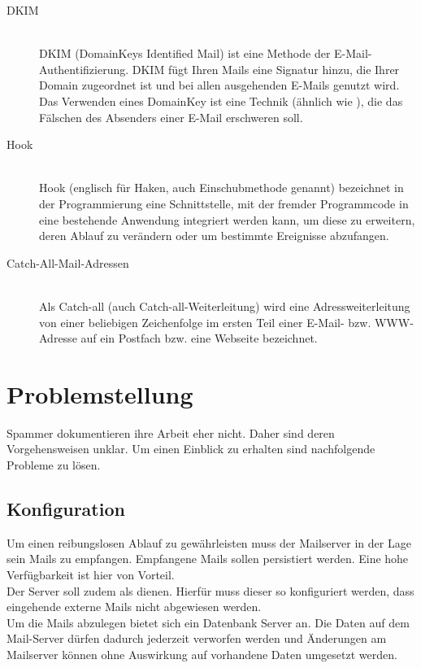 \documentclass[a4paper,11pt,singlespacing]{article}
\begin{document}
\begin{description}
	\item[DKIM\label{itm:DKIM}]\hfill \\
		DKIM (DomainKeys Identified Mail) ist eine Methode der E-Mail-Authentifizierung. DKIM fügt Ihren Mails eine Signatur hinzu, die Ihrer Domain zugeordnet ist und bei allen ausgehenden E-Mails genutzt wird. Das Verwenden eines DomainKey ist eine Technik (ähnlich wie  ), die das Fälschen des Absenders einer E-Mail erschweren soll.\cite{DKIM}
	\item[Hook\label{itm:Hook}]\hfill \\
		Hook (englisch für Haken, auch Einschubmethode genannt) bezeichnet in der Programmierung eine Schnittstelle, mit der fremder Programmcode in eine bestehende Anwendung integriert werden kann, um diese zu erweitern, deren Ablauf zu verändern oder um bestimmte Ereignisse abzufangen.\cite{Hook}
	\item[Catch-All-Mail-Adressen\label{itm:Catch-All-Mail}]\hfill \\
		Als Catch-all (auch Catch-all-Weiterleitung) wird eine Adressweiterleitung von einer beliebigen Zeichenfolge im ersten Teil einer E-Mail- bzw. WWW-Adresse auf ein Postfach bzw. eine Webseite bezeichnet.\cite{Catch-All-Mail}
	\end{description}

\newpage


\section{Problemstellung}\label{sec:Problemstellung}
	Spammer dokumentieren ihre Arbeit eher nicht.
	Daher sind deren Vorgehensweisen unklar.
	Um einen Einblick zu erhalten sind nachfolgende Probleme zu lösen.

	\subsection{Konfiguration}\label{sec:ProblemstellungKonfiguration}
		Um einen reibungslosen Ablauf zu gewährleisten muss der Mailserver in der Lage sein Mails zu empfangen.
		Empfangene Mails sollen persistiert werden.
		Eine hohe Verfügbarkeit ist hier von Vorteil.
		\\
		Der Server soll zudem als  dienen.
		Hierfür muss dieser so konfiguriert werden, dass eingehende externe Mails nicht abgewiesen werden.
		\\
		Um die Mails abzulegen bietet sich ein Datenbank Server an.
		Die Daten auf dem Mail-Server dürfen dadurch jederzeit verworfen werden und Änderungen am Mailserver können ohne Auswirkung auf vorhandene Daten umgesetzt werden.
\end{document}
